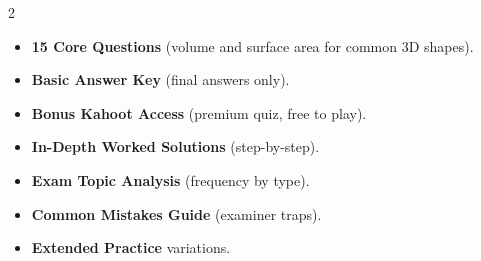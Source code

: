 \documentclass[11pt,a4paper]{article}
\newcommand{\FullReleaseDate}{April 30, 2026}
\begin{document}
\vspace{8pt}

\begin{multicols}{2}
  \begin{tcolorbox}[card, title=\sffamily\bfseries\textcolor{white}{\faHandPointDown\ TODAY (Simplified Version)}, colbacktitle=mainblue, boxed title style={sharp corners, boxrule=0pt}]
    \begin{itemize}[leftmargin=1.2em, itemsep=2pt]
      \item \small \textbf{15 Core Questions} (volume and surface area for common 3D shapes).
      \item \small \textbf{Basic Answer Key} (final answers only).
      \item \small \textbf{Bonus Kahoot Access} (premium quiz, free to play).
    \end{itemize}
  \end{tcolorbox}

  \columnbreak

  \begin{tcolorbox}[card, title=\sffamily\bfseries\textcolor{white}{\faRocket\ ON \FullReleaseDate\ (Full Upgrade)}, colbacktitle=mainblue, boxed title style={sharp corners, boxrule=0pt}]
    \begin{itemize}[leftmargin=1.2em, itemsep=2pt]
      \item \small \textbf{In-Depth Worked Solutions} (step-by-step).
      \item \small \textbf{Exam Topic Analysis} (frequency by type).
      \item \small \textbf{Common Mistakes Guide} (examiner traps).
      \item \small \textbf{Extended Practice} variations.
    \end{itemize}
  \end{tcolorbox}
\end{multicols}
\end{document}
